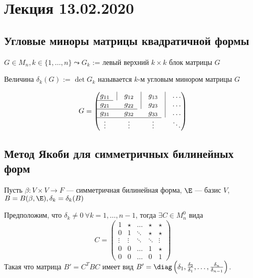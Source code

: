 \section{Лекция 13.02.2020}


\subsection{Угловые миноры матрицы квадратичной формы}

$G \in M_{n}, k \in \{1, \dots, n\} \leadsto G_{k}$ := левый верхний $k \times k$ блок матрицы $G$

\begin{definition}
    Величина $\delta_k (G)$ := $\det G_{k}$ называется $k$-м угловым минором матрицы $G$    

\begin{equation*}
G = \begin{pmatrix}
        g_{11} & \vline & g_{12} & \vline & g_{13} & \vline & \dots \\ 
        \cline{1-1}
        g_{21} &        & g_{22} & \vline & g_{23} & \vline & \dots \\ 
        \cline{1-3}
        g_{31} &        & g_{32} &        & g_{33} & \vline & \dots \\
        \cline{1-5}
        \vdots &        & \vdots &        & \vdots &        & \ddots
    \end{pmatrix}
\end{equation*}


\end{definition}

\subsection{Метод Якоби для симметричных билинейных форм}

Пусть $\beta \colon V \times V \to F$ --- симметричная билинейная форма, $\E$ --- базис $V$, $B = B(\beta, \E), \delta_{k} = \delta_k(B)$

\begin{theorem}
    Предположим, что $\delta_{k} \neq 0  \ \forall k = 1, \dots, n-1$, тогда $\exists C \in M^{0}_{n}$ вида
    \begin{equation*}
    C = \begin{pmatrix} 
        1 & \star & \dots & \star & \star \\
        0 & 1 & \ddots & \star & \star \\
        \vdots & \vdots & \ddots & \ddots & \vdots \\
        0 & 0 & \dots & 1 & \star \\
        0 & 0 & \dots & 0 & 1
    \end{pmatrix}
    \end{equation*}
    Такая что матрица $B' = C^{T} B C$ имеет вид $B' = \diag\left(\delta_1, \frac{\delta_2}{\delta_1}, \dots, \frac{\delta_n}{\delta_{n - 1}}\right)$.
\end{theorem}

